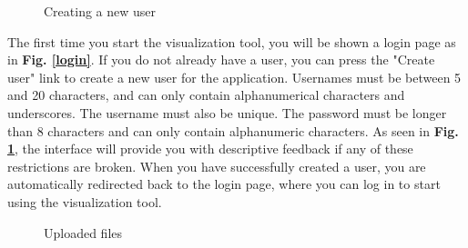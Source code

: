 \begin{figure}[h!]
    \centering
        \caption{Creating a new user}
        \label{create-user}
\end{figure}

\noindent The first time you start the visualization tool, you will be shown a login page as in \textbf{Fig. \ref{login}}. If you do not already have a user, you can press the "Create user" link to create a new user for the application. Usernames must be between 5 and 20 characters, and can only contain alphanumerical characters and underscores. The username must also be unique. The password must be longer than 8 characters and can only contain alphanumeric characters. As seen in \textbf{Fig. \ref{create-user}}, the interface will provide you with descriptive feedback if any of these restrictions are broken. When you have successfully created a user, you are automatically redirected back to the login page, where you can log in to start using the visualization tool. \\


\begin{figure}[h!]
    \centering
        \caption{Uploaded files}
        \label{all-files}
\end{figure}

